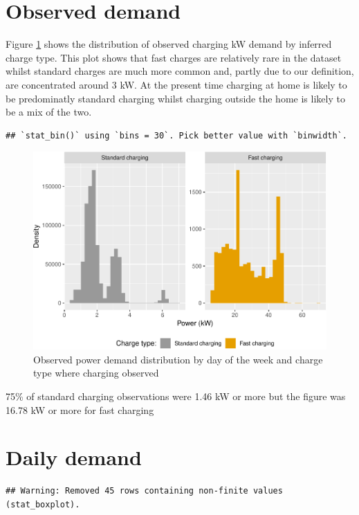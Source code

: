 \documentclass[]{article}
\begin{document}
\section{Observed demand}\label{observed-demand}

Figure \ref{fig:obsPower} shows the distribution of observed charging kW
demand by inferred charge type. This plot shows that fast charges are
relatively rare in the dataset whilst standard charges are much more
common and, partly due to our definition, are concentrated around 3 kW.
At the present time charging at home is likely to be predominatly
standard charging whilst charging outside the home is likely to be a mix
of the two.

\begin{verbatim}
## `stat_bin()` using `bins = 30`. Pick better value with `binwidth`.
\end{verbatim}

\begin{figure}
\centering
\includegraphics{EVBB_report_files/figure-latex/obsPower-1.pdf}
\caption{\label{fig:obsPower}Observed power demand distribution by day of
the week and charge type where charging observed}
\end{figure}

75\% of standard charging observations were 1.46 kW or more but the
figure was 16.78 kW or more for fast charging

\section{Daily demand}\label{daily-demand}

\begin{verbatim}
## Warning: Removed 45 rows containing non-finite values (stat_boxplot).
\end{verbatim}
\end{document}
